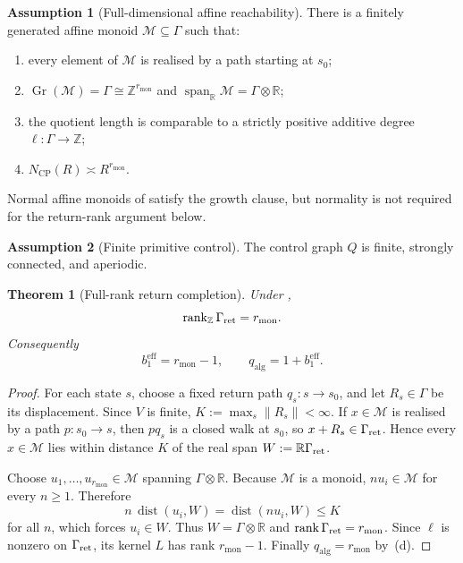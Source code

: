 \documentclass[11pt]{article}
\newtheorem{theorem}{Theorem}[section]
\theoremstyle{definition}
\newtheorem{assumption}{Assumption}[section]
\theoremstyle{remark}
\newcommand{\Z}{\mathbb{Z}}
\newcommand{\R}{\mathbb{R}}
\newcommand{\M}{\mathcal{M}}
\newcommand{\qalg}{q_{\mathrm{alg}}}
\newcommand{\rmon}{r_{\mathrm{mon}}}
\newcommand{\beff}{b_1^{\mathrm{eff}}}
\newcommand{\Ncp}{N_{\mathrm{CP}}}
\newcommand{\Lat}{L}
\newcommand{\rank}{\operatorname{rank}}
\newcommand{\Gr}{\operatorname{Gr}}
\newcommand{\spn}{\operatorname{span}}
\begin{document}
\begin{assumption}[Full-dimensional affine reachability]
\label{ass:full-rank-reachability}
There is a finitely generated affine monoid \(\M\subseteq\Gamma\) such that:
\begin{enumerate}[label=\textup{(\alph*)},leftmargin=2.2em]
\item every element of \(\M\) is realised by a path starting at \(s_0\);
\item \(\Gr(\M)=\Gamma\cong\Z^{\rmon}\) and
      \(\spn_{\R}\M=\Gamma\otimes\R\);
\item the quotient length is comparable to a strictly positive additive degree
      \(\ell:\Gamma\to\Z\);
\item \(\Ncp(R)\asymp R^{\rmon}\).
\end{enumerate}
Normal affine monoids of  satisfy the growth clause, but
normality is not required for the return-rank argument below.
\end{assumption}

\begin{assumption}[Finite primitive control]
\label{ass:finite-primitive-control}
The control graph \(Q\) is finite, strongly connected, and aperiodic.
\end{assumption}

\begin{theorem}[Full-rank return completion]
\label{thm:full-rank-returns}
Under ,
\[
 \rank_{\Z}\Gamma_{\rm ret}=\rmon .
\]
Consequently
\[
 \boxed{\beff=\rmon-1,\qquad \qalg=1+\beff.}
\]
\end{theorem}

\begin{proof}
For each state \(s\), choose a fixed return path \(q_s:s\to s_0\), and let
\(R_s\in\Gamma\) be its displacement.  Since \(V\) is finite,
\(K:=\max_s\|R_s\|<\infty\).  If \(x\in\M\) is realised by a path
\(p:s_0\to s\), then \(pq_s\) is a closed walk at \(s_0\), so
\(x+R_s\in\Gamma_{\rm ret}\).  Hence every \(x\in\M\) lies within distance
\(K\) of the real span \(W:=\R\Gamma_{\rm ret}\).

Choose \(u_1,\ldots,u_{\rmon}\in\M\) spanning \(\Gamma\otimes\R\).
Because \(\M\) is a monoid, \(nu_i\in\M\) for every \(n\ge1\).  Therefore
\[
 n\,\operatorname{dist}(u_i,W)
 =\operatorname{dist}(nu_i,W)\le K
\]
for all \(n\), which forces \(u_i\in W\).  Thus
\(W=\Gamma\otimes\R\) and \(\rank\Gamma_{\rm ret}=\rmon\).
Since \(\ell\) is nonzero on \(\Gamma_{\rm ret}\), its kernel \(\Lat\) has
rank \(\rmon-1\).  Finally \(\qalg=\rmon\) by
\,(d).
\end{proof}
\end{document}
